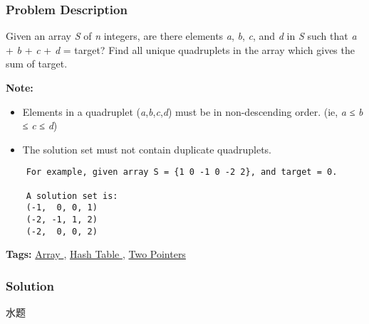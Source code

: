 \documentclass{article}
\begin{document}
\begin{CJK*}{UTF8}{gkai}
\subsubsection*{Problem Description}
Given an array \emph{S} of \emph{n} integers, are there elements \emph{a}, \emph{b}, \emph{c}, and \emph{d} in \emph{S} such that \emph{a} + \emph{b} + \emph{c} + \emph{d} = target? Find all unique quadruplets in the array which gives the sum of target.

\textbf{Note:}



\begin{itemize}
\item Elements in a quadruplet (\emph{a},\emph{b},\emph{c},\emph{d}) must be in non-descending order. (ie, \emph{a} ≤ \emph{b} ≤ \emph{c} ≤ \emph{d})
\item The solution set must not contain duplicate quadruplets.
\end{itemize}

\begin{verbatim}
    For example, given array S = {1 0 -1 0 -2 2}, and target = 0.

    A solution set is:
    (-1,  0, 0, 1)
    (-2, -1, 1, 2)
    (-2,  0, 0, 2)
\end{verbatim}

\textbf{Tags: }
\hyperref[ Array ]{ Array },  \hyperref[ Hash Table ]{ Hash Table },  \hyperref[ Two Pointers ]{ Two Pointers }



\subsubsection*{Solution}
水题


\end{CJK*}
\end{document}
